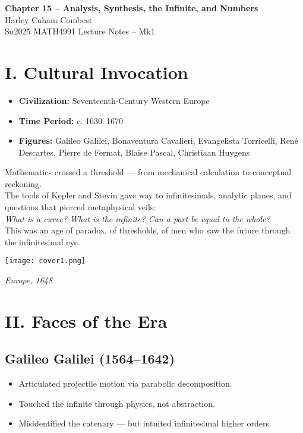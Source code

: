 \documentclass[9pt]{article}
\begin{document}
\begin{center}
\Large\textbf{Chapter 15 – Analysis, Synthesis, the Infinite, and Numbers} \\
\large Harley Caham Combest \\
\large Su2025 MATH4991 Lecture Notes – Mk1
\end{center}

\vspace{1em}

\section*{I. Cultural Invocation}

\begin{itemize}
  \item \textbf{Civilization:} Seventeenth-Century Western Europe
  \item \textbf{Time Period:} c. 1630--1670
  \item \textbf{Figures:} Galileo Galilei, Bonaventura Cavalieri, Evangelista Torricelli, René Descartes, Pierre de Fermat, Blaise Pascal, Christiaan Huygens
\end{itemize}

Mathematics crossed a threshold — from mechanical calculation to conceptual reckoning.\\

The tools of Kepler and Stevin gave way to infinitesimals, analytic planes, and questions that pierced metaphysical veils:\\

\emph{What is a curve? What is the infinite? Can a part be equal to the whole?}\\

This was an age of paradox, of thresholds, of men who saw the future through the infinitesimal eye.\\

\begin{center}
    \texttt{[image: cover1.png]}
    
    \textit{Europe, 1648}
\end{center}

\newpage

\section*{II. Faces of the Era}

\subsection*{Galileo Galilei (1564–1642)}
\begin{itemize}
  \item Articulated projectile motion via parabolic decomposition.
  \item Touched the infinite through physics, not abstraction.
  \item Misidentified the catenary — but intuited infinitesimal higher orders.
\end{itemize}
\end{document}
